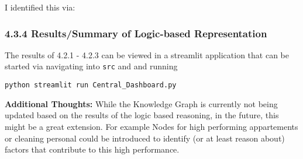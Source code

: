 I identified this via:

\begin{Shaded}
\begin{Highlighting}[]
\end{Highlighting}
\end{Shaded}

\begin{Shaded}
\begin{Highlighting}[]
\end{Highlighting}
\end{Shaded}

\subsubsection{4.3.4 Results/Summary of Logic-based
Representation}\label{resultssummary-of-logic-based-representation}

The results of 4.2.1 - 4.2.3 can be viewed in a streamlit application
that can be started via navigating into \texttt{src} and and running

\begin{verbatim}
python streamlit run Central_Dashboard.py
\end{verbatim}

\textbf{Additional Thoughts:} While the Knowledge Graph is currently not
being updated based on the results of the logic based reasoning, in the
future, this might be a great extension. For example Nodes for high
performing appartements or cleaning personal could be introduced to
identify (or at least reason about) factors that contribute to this high
performance.


